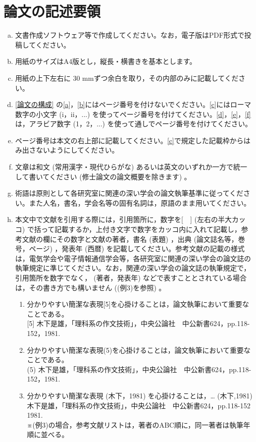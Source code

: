 \documentclass{kupaper}
\begin{document}
\chapter{論文の記述要領}
\begin{enumerate}[a.]
	\item 文書作成ソフトウェア等で作成してください。なお，電子版はPDF形式で投稿してください。
	\item 用紙のサイズはA4版とし，縦長・横書きを基本とします。
	\item 用紙の上下左右に 30 mmずつ余白を取り，その内部のみに記載してください。
	\item \ref{論文の構成} の\ref{a}，\ref{b}にはページ番号を付けないでください。\ref{c}にはローマ数字の小文字 (i，ii，...) を使ってページ番号を付けてください。\ref{d}，\ref{e}，\ref{f}は，アラビア数字 (1，2，...) を使って通しでページ番号を付けてください。
	\item ページ番号は本文の右上部に記載してください。\ref{c}で規定した記載枠からはみ出さないようにしてください。
	\item 文章は和文 (常用漢字・現代ひらがな) あるいは英文のいずれか一方で統一して書いてください (修士論文の論文概要を除きます) 。
	\item 術語は原則として各研究室に関連の深い学会の論文執筆基準に従ってください。また人名，書名，学会名等の固有名詞は，原語のまま用いてください。
	\item 本文中で文献を引用する際には，引用箇所に，数字を[　] (左右の半大カッコ) で括って記載するか，上付き文字で数字をカッコ内に入れて記載し，参考文献の欄にその数字と文献の著者，書名 (表題) ，出典 (論文誌名等，巻号，ページ) ，発表年 (西暦) を記載してください。参考文献の記載の様式は，電気学会や電子情報通信学会等，各研究室に関連の深い学会の論文誌の執筆規定に準じてください。なお，関連の深い学会の論文誌の執筆規定で，引用箇所を数字でなく， (著者，発表年) などで表すこととされている場合は，その書き方でも構いません ((例3)を参照) 。
	      	      
	      \begin{enumerate}[(例1)]
	      	\item 
	      	      分かりやすい簡潔な表現[5]を心掛けることは，論文執筆において重要なことである。\\
	      	      {[5]} 木下是雄，「理科系の作文技術」，中央公論社　中公新書624，pp.118-152，1981.
	      	\item 
	      	      分かりやすい簡潔な表現(5)を心掛けることは，論文執筆において重要なことである。\\
	      	      (5) 木下是雄，「理科系の作文技術」，中央公論社　中公新書624，pp.118-152，1981.
	      	\item \label{例3}
	      	      分かりやすい簡潔な表現 (木下，1981) を心掛けることは，…
	      	      (木下,1981)  \\
	      	      木下是雄，「理科系の作文技術」，中央公論社　中公新書624，pp.118-152 1981.\\
	      	      ※(例3)の場合，参考文献リストは，著者のABC順に，同一著者は執筆年順に並べる。
	      \end{enumerate}
	      	      

\end{enumerate}
\end{document}
